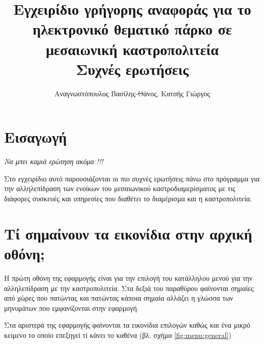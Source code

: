 \documentclass[a4paper,titlepage,twoside,12pt,leqno]{article}
\title{Εγχειρίδιο γρήγορης αναφοράς για το ηλεκτρονικό θεματικό πάρκο σε μεσαιωνική καστροπολιτεία \\ Συχνές ερωτήσεις}
\author{Αναγνωστόπουλος Βασίλης-Θάνος, Κατσής Γιώργος}
\date{}
\begin{document}
\maketitle
\tableofcontents
\listoffigures
\listoftables
\newpage

\section{Εισαγωγή}

\emph{Να μπει καμιά ερώτηση ακόμα !!!}


Στο εγχειρίδιο αυτό παρουσιάζονται οι πιο συχνές ερωτήσεις πάνω στο πρόγραμμα για την αλληλεπίδραση των ενοίκων του μεσαιωνικού καστροδιαμερίσματος με τις διάφορες συσκευές και υπηρεσίες που διαθέτει το διαμέρισμα και η καστροπολιτεία.



\section{Τί σημαίνουν τα εικονίδια στην αρχική οθόνη;}

Η πρώτη οθόνη της εφαρμογής είναι για την επιλογή του κατάλληλου μενού για την αλληλεπίδραση με την καστροπολιτεία. Στα δεξιά του παραθύρου φαίνονται σημαίες από χώρες που πατώντας και πατώντας κάποια σημαία αλλάζει η γλώσσα των μηνυμάτων που εμφανίζονται στην εφαρμογή.

Στα αριστερά της εφαρμογής φαίνονται τα εικονίδια επιλογών καθώς και ένα μικρό κείμενο το οποίο επεξηγεί τί κάνει το καθένα (βλ. σχήμα \ref{fig:menu:general})
\end{document}
